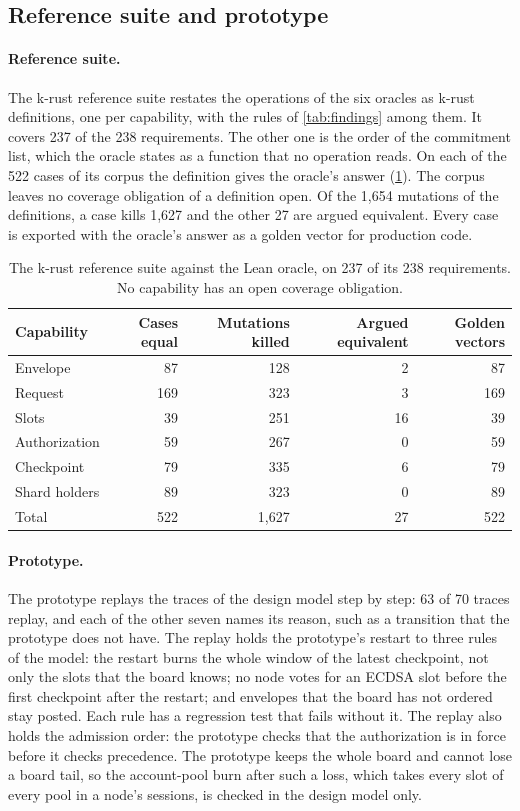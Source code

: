 \subsection{Reference suite and prototype}

\paragraph{Reference suite.} The k-rust reference suite restates the operations of the six oracles as k-rust definitions, one per capability, with the rules of \cref{tab:findings} among them. It covers 237 of the 238 requirements. The other one is the order of the commitment list, which the oracle states as a function that no operation reads. On each of the 522 cases of its corpus the definition gives the oracle's answer (\cref{tab:krs}). The corpus leaves no coverage obligation of a definition open. Of the 1{,}654 mutations of the definitions, a case kills 1{,}627 and the other 27 are argued equivalent. Every case is exported with the oracle's answer as a golden vector for production code.

\begin{table}[t]
\centering
\small
\begin{tabular}{@{}lrrrr@{}}
\toprule
Capability & Cases equal & Mutations killed & Argued equivalent & Golden vectors \\
\midrule
Envelope & 87 & 128 & 2 & 87 \\
Request & 169 & 323 & 3 & 169 \\
Slots & 39 & 251 & 16 & 39 \\
Authorization & 59 & 267 & 0 & 59 \\
Checkpoint & 79 & 335 & 6 & 79 \\
Shard holders & 89 & 323 & 0 & 89 \\
\midrule
Total & 522 & 1{,}627 & 27 & 522 \\
\bottomrule
\end{tabular}
\caption{The k-rust reference suite against the Lean oracle, on 237 of its 238 requirements. No capability has an open coverage obligation.}
\label{tab:krs}
\end{table}

\paragraph{Prototype.} The prototype replays the traces of the design model step by step: 63 of 70 traces replay, and each of the other seven names its reason, such as a transition that the prototype does not have. The replay holds the prototype's restart to three rules of the model: the restart burns the whole window of the latest checkpoint, not only the slots that the board knows; no node votes for an ECDSA slot before the first checkpoint after the restart; and envelopes that the board has not ordered stay posted. Each rule has a regression test that fails without it. The replay also holds the admission order: the prototype checks that the authorization is in force before it checks precedence. The prototype keeps the whole board and cannot lose a board tail, so the account-pool burn after such a loss, which takes every slot of every pool in a node's sessions, is checked in the design model only.

